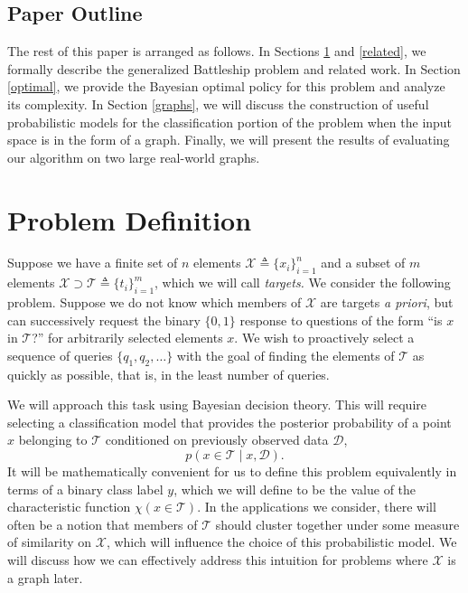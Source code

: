 \documentclass{acm_proc_article-sp}
\newcommand{\cm}[1]{\mathcal{#1}}
\newcommand{\data}{\cm{D}}
\newcommand{\given}{\mid}
\newcommand{\deq}{\triangleq}
\begin{document}
\subsection{Paper Outline}

The rest of this paper is arranged as follows.  In Sections
\ref{problem} and \ref{related}, we formally describe the generalized
Battleship problem and related work.  In Section \ref{optimal}, we
provide the Bayesian optimal policy for this problem and analyze its
complexity.  In Section \ref{graphs}, we will discuss the construction
of useful probabilistic models for the classification portion of the
problem when the input space is in the form of a graph.  Finally, we
will present the results of evaluating our algorithm on two large
real-world graphs.

\section{Problem Definition}
\label{problem}

Suppose we have a finite set of $n$ elements $\cm{X} \deq \lbrace x_i
\rbrace_{i = 1}^n$ and a subset of $m$ elements $\cm{X} \supset \cm{T}
\deq \lbrace t_i \rbrace_{i = 1}^m$, which we will call
\emph{targets.}  We consider the following problem.  Suppose we do not
know which members of $\cm{X}$ are targets \emph{a priori}, but can
successively request the binary $\lbrace 0, 1 \rbrace$ response to
questions of the form ``is $x$ in $\cm{T}$?'' for arbitrarily selected
elements $x$. We wish to proactively select a sequence of queries
$\lbrace q_1, q_2, \dotsc \rbrace$ with the goal of finding the
elements of $\cm{T}$ as quickly as possible, that is, in the least number
of queries.

We will approach this task using Bayesian decision theory.  This will
require selecting a classification model that provides the posterior
probability of a point $x$ belonging to $\cm{T}$ conditioned on
previously observed data $\data$,
\begin{equation*}
  p(x \in \cm{T} \given x, \data).
\end{equation*} 
It will be mathematically convenient for us to define this problem
equivalently in terms of a binary class label $y$, which we will
define to be the value of the characteristic function $\chi(x \in
\cm{T})$.  In the applications we consider, there will often be a
notion that members of $\cm{T}$ should cluster together under some
measure of similarity on $\cm{X}$, which will influence the choice of
this probabilistic model.  We will discuss how we can effectively
address this intuition for problems where $\cm{X}$ is a graph later.
\end{document}
